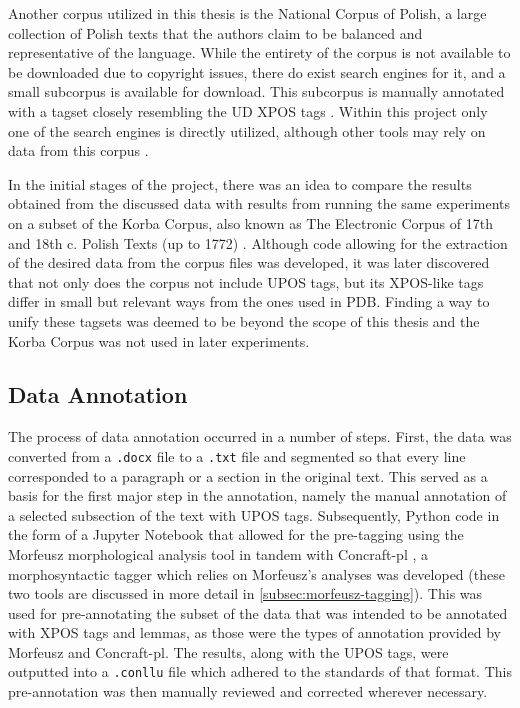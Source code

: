 Another corpus utilized in this thesis is the National Corpus of Polish, a large collection of Polish texts that the authors claim to be balanced and representative of the language. While the entirety of the corpus is not available to be downloaded due to copyright issues, there do exist search engines for it, and a small subcorpus is available for download. This subcorpus is manually annotated with a tagset closely resembling the UD XPOS tags \citep{nkjp}. Within this project only one of the search engines is directly utilized, although other tools may rely on data from this corpus \citep{pęzik_2012}.

In the initial stages of the project, there was an idea to compare the results obtained from the discussed data with results from running the same experiments on a subset of the Korba Corpus, also known as The Electronic Corpus of 17th and 18th c. Polish Texts (up to 1772) \citep{korba}. Although code allowing for the extraction of the desired data from the corpus files was developed, it was later discovered that not only does the corpus not include UPOS tags, but its XPOS-like tags differ in small but relevant ways from the ones used in PDB. Finding a way to unify these tagsets was deemed to be beyond the scope of this thesis and the Korba Corpus was not used in later experiments. 

\subsection{Data Annotation}
\label{subsec:annotation}

The process of data annotation occurred in a number of steps. First, the data was converted from a \texttt{.docx} file to a \texttt{.txt} file and segmented so that every line corresponded to a paragraph or a section in the original text. This served as a basis for the first major step in the annotation, namely the manual annotation of a selected subsection of the text with UPOS tags. Subsequently, Python code in the form of a Jupyter Notebook that allowed for the pre-tagging using the Morfeusz morphological analysis tool \citep{kie:wol:17:morf} in tandem with Concraft-pl \citep{waszczuk-2012-harnessing, waszczuk2018morphosyntactic}, a morphosyntactic tagger which relies on Morfeusz's analyses was developed (these two tools are discussed in more detail in \autoref{subsec:morfeusz-tagging}). This was used for pre-annotating the subset of the data that was intended to be annotated with XPOS tags and lemmas, as those were the types of annotation provided by Morfeusz and Concraft-pl. The results, along with the UPOS tags, were outputted into a \texttt{.conllu} file which adhered to the standards of that format. This pre-annotation was then manually reviewed and corrected wherever necessary.

